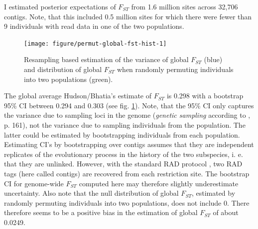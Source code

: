 \documentclass[a4paper,12pt,times,print,index,custombib,custommargin]{PhDThesisPSnPDF}\usepackage[]{graphicx}\usepackage[]{color}
\newenvironment{knitrout}{}{} %
\begin{document}
I estimated posterior expectations of $F_{ST}$ from 1.6 million sites across 32,706 contigs. Note, that this included 0.5 million sites for which there were fewer than 9 individuals with read data in one of the two populations.
%
\begin{figure}[htb]
\centering
\begin{knitrout}
\color{fgcolor}

{\centering \texttt{[image: figure/permut-global-fst-hist-1]} 

}



\end{knitrout}
\caption{Resampling based estimation of the variance of global $F_{ST}$ (blue) and distribution of global $F_{ST}$ when randomly permuting individuals into two populations (green).}
\label{Fig:global-fst}
\end{figure}
%
The global average Hudson/Bhatia's estimate of $F_{ST}$ is 0.298 with a bootstrap 95\% \gls{CI} between 0.294 and 0.303 (see fig. \ref{Fig:global-fst}). Note, that the 95\% \gls{CI} only captures the variance due to sampling loci in the genome (\emph{genetic sampling} according to \cite{Weir1996}, p. 161), not the variance due to sampling individuals from the population. The latter could be estimated by bootstrapping individuals from each population. Estimating \gls{CI}'s by bootstrapping over contigs assumes that they are independent replicates of the evolutionary process in the history of the two subspecies, i. e. that they are unlinked. However, with the standard RAD protocol \citep{Baird2008}, two RAD tags (here called contigs) are recovered from each restriction site. The bootstrap \gls{CI} for genome-wide $F_{ST}$ computed here may therefore slightly underestimate uncertainty. Also note that the null distribution of global $F_{ST}$, estimated by randomly permuting individuals into two populations, does not include 0. There therefore seems to be a positive bias in the estimation of global $F_{ST}$ of about 0.0249.
\end{document}
